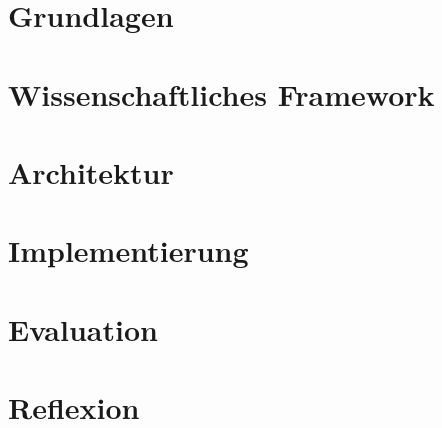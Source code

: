 	\chapter{Grundlagen}
		\label{chap:grundlagen}
		
		
	\chapter{Wissenschaftliches Framework}
		\label{chap:wissenschaftliches_framework}
		
		
	\chapter{Architektur}
		\label{chap:architektur}
		
		
	\chapter{Implementierung}
		\label{chap:implementierung}
		
	\chapter{Evaluation}
		\label{chap:evaluation}
		
	\chapter{Reflexion}
		\label{chap:reflexion}


	\pagestyle{plain}
	\clearpage
	\printbibliography

